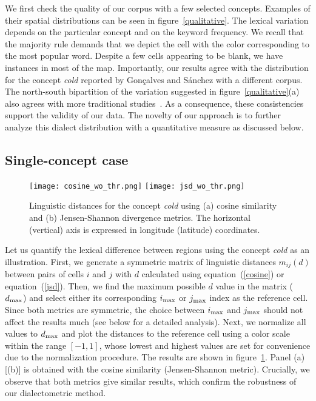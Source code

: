 \documentclass[11pt]{article}
\begin{document}
We first check the quality of our corpus with a few selected concepts. Examples of their spatial distributions
can be seen in figure~\ref{qualitative}. The lexical variation depends on the particular concept and on the keyword frequency.
We recall that the majority rule demands that we depict the cell with the color corresponding to the most popular word.
Despite a few cells appearing to be blank, we have instances in most of the map. 
Importantly, our results agree with the distribution for the concept \emph{cold} reported by Gon\c{c}alves and S\'anchez 
with a different corpus. The north-south bipartition of the variation suggested in figure~\ref{qualitative}(a)
also agrees with more traditional studies~\cite{fernandez}. As a consequence, these consistencies support the validity of our data.
The novelty of our approach is to further analyze this dialect distribution with a quantitative measure as discussed below.

\subsection{Single-concept case}

\begin{figure}[t]
\centering
{\texttt{[image: cosine\_wo\_thr.png]}}
{\texttt{[image: jsd\_wo\_thr.png]}}
\caption{Linguistic distances for the concept \emph{cold} using (a) cosine similarity and (b) Jensen-Shannon divergence metrics.
The horizontal (vertical) axis is expressed in longitude (latitude) coordinates.}
\label{wothreshold}
\end{figure}

Let us quantify the lexical difference between regions using the concept \emph{cold} as an illustration.
First, we generate a symmetric matrix of linguistic distances $m_{ij}(d)$ between pairs of cells $i$ and $j$
with $d$ calculated using equation~(\ref{cosine}) or equation~(\ref{jsd}).
Then, we find the maximum possible $d$ value in the matrix ($d_{\rm max}$)
and select either its corresponding $i_{\rm max}$ or $j_{\rm max}$
index as the reference cell. Since both metrics are symmetric, the choice between $i_{\rm max}$ and $j_{\rm max}$
should not affect the results much (see below for a detailed analysis).
Next, we normalize all values to $d_{\rm max}$ and plot the distances to the reference cell
using a color scale within the range $[-1,1]$, whose lowest and highest values are set for convenience due to the normalization procedure.
The results are shown in figure~\ref{wothreshold}. Panel (a) [(b)] is obtained with the cosine similarity (Jensen-Shannon metric).
Crucially, we observe that both metrics give similar results, which confirm the robustness of our dialectometric method.
\end{document}
